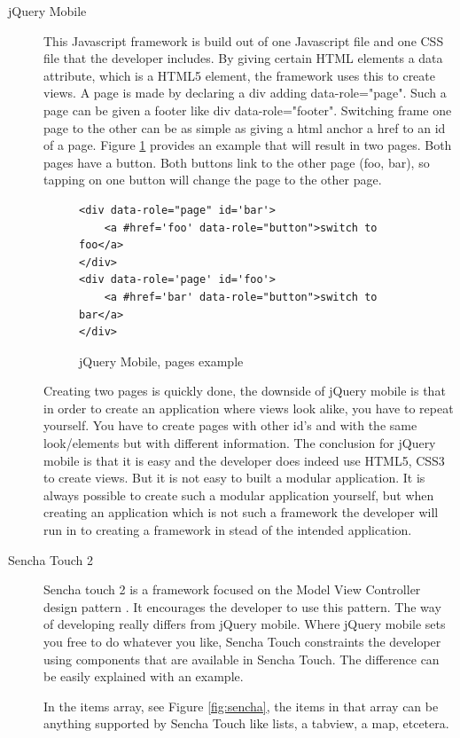 \begin{description}
\item [jQuery Mobile]
This Javascript framework is build out of one Javascript file and one CSS file that the developer includes. By giving certain HTML elements a data attribute, which is a HTML5 element, the framework uses this to create views. A page is made by declaring a div adding data-role="page". Such a page can be given a footer like div data-role="footer". 
Switching frame one page to the other can be as simple as giving a html anchor a href to an id of a page. Figure \ref{fig:jquery} provides an example that will result in two pages. Both pages have a button. Both buttons link to the other page (foo, bar), so tapping on one button will change the page to the other page.
\begin{figure}[H]
\begin{lstlisting}
<div data-role="page" id='bar'>
	<a #href='foo' data-role="button">switch to foo</a>
</div>
<div data-role='page' id='foo'>
	<a #href='bar' data-role="button">switch to bar</a>
</div>
\end{lstlisting}
\caption{jQuery Mobile, pages example}
\label{fig:jquery}
\end{figure}

Creating two pages is quickly done, the downside of jQuery mobile is that in order to create an application where views look alike, you have to repeat yourself. You have to create pages with other id's and with the same look/elements but with different information. The conclusion for jQuery mobile is that it is easy and the developer does indeed use HTML5, CSS3 to create views.  But it is not easy to built a modular application. It is always possible to create such a modular application yourself, but when creating an application which is not such a framework the developer will run in to creating a framework in stead of the intended application.

\item [Sencha Touch 2]
Sencha touch 2 is a framework focused on the Model View Controller design pattern \cite{MVC}. It encourages the developer to use this pattern. The way of developing really differs from jQuery mobile. Where jQuery mobile sets you free to do whatever you like, Sencha Touch constraints the developer using components that are available in Sencha Touch. The difference can be easily explained with an example.

In the items array, see Figure \ref{fig:sencha}, the items in that array can be anything supported by Sencha Touch like lists, a tabview, a map, etcetera. 


\end{description}
